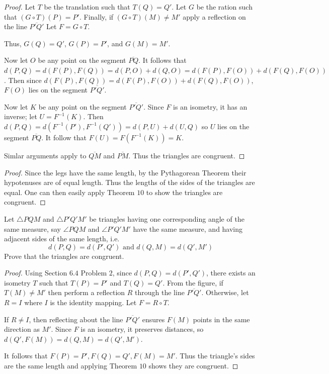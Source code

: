 \begin{proof}
    Let $T$ be the translation such that $T(Q) = Q'$.
    Let $G$ be the ration such that $(G \circ T)(P) = P'$.
    Finally, if $(G \circ T)(M) \not = M'$ apply a reflection on the line $\overline{P'Q'}$
    Let $F = G \circ T$.

    Thus, $G(Q) = Q'$, $G(P) = P'$, and $G(M) = M'$.

    Now let $O$ be any point on the segment $\overline{PQ}$.
    It follows that $d(P, Q) = d(F(P), F(Q)) = d(P, O) + d(Q, O) = d(F(P), F(O)) + d(F(Q), F(O))$.
    Then since $d(F(P), F(Q)) = d(F(P), F(O)) + d(F(Q), F(O))$, $F(O)$ lies on the segment $\overline{P'Q'}$.

    Now let $K$ be any point on the segment $\overline{P'Q'}$.
    Since $F$ is an isometry, it has an inverse; let $U = F^{-1}(K)$.
    Then $d(P, Q) = d(F^{-1}(P'), F^{-1}(Q')) = d(P, U) + d(U, Q)$ so $U$ lies on the segment $\overline{PQ}$.
    It follow that  $F(U) = F(F^{-1}(K)) = K$.

    Simlar arguments apply to $\overline{QM}$ and $\overline{PM}$.
    Thus the triangles are congruent.
\end{proof}

\begin{proof}
    Since the legs have the same length, by the Pythagorean Theorem their hypotenuses are of equal length.
    Thus the lengths of the sides of the triangles are equal.
    One can then easily apply Theorem $10$ to show the triangles are congruent.
\end{proof}

\begin{tcolorbox}[title=Problem 7, breakable]
    Let $\triangle PQM$ and $\triangle P'Q'M'$ be triangles 
        having one corresponding angle of the same measure,
        say $\angle PQM$ and $\angle P'Q'M'$ have the same measure,
        and having adjacent sides of the same length, i.e.
        \[d(P, Q) = d(P', Q') \text{ and } d(Q, M) = d(Q', M')\]
        Prove that the triangles are congruent.
\end{tcolorbox}

\begin{proof}
    Using Section $6.4$ Problem $2$, since $d(P,Q) = d(P',Q')$, 
        there exists an isometry $T$ such that $T(P) = P'$ and $T(Q) = Q'$.
    From the figure, if $T(M) \ne M'$ then perform a reflection $R$ through the line $\overline{P'Q'}$.
    Otherwise, let $R = I$ where $I$ is the identity mapping.
    Let $F = R \circ T$.

    If $R \ne I$, then reflecting about the line $\overline{P'Q'}$     
        ensures $F(M)$ points in the same direction as $M'$.
    Since $F$ is an isometry, it preserves distances, so $d(Q',F(M)) = d(Q,M) = d(Q',M')$.

    It follows that $F(P) = P', F(Q) = Q', F(M) = M'$.
    Thus the triangle's sides are the same length and applying Theorem $10$ shows 
        they are congruent.
\end{proof}


